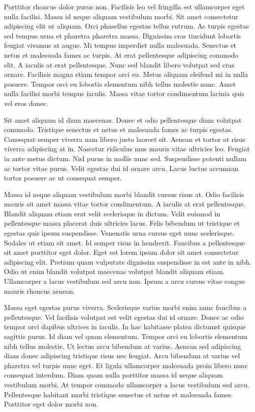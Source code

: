 \documentclass[11pt,a4paper]{article}
\begin{document}
Porttitor rhoncus dolor purus non. Facilisis leo vel fringilla est ullamcorper eget nulla facilisi. Massa id neque aliquam vestibulum morbi. Sit amet consectetur adipiscing elit ut aliquam. Orci phasellus egestas tellus rutrum. Ac turpis egestas sed tempus urna et pharetra pharetra massa. Dignissim cras tincidunt lobortis feugiat vivamus at augue. Mi tempus imperdiet nulla malesuada. Senectus et netus et malesuada fames ac turpis. At erat pellentesque adipiscing commodo elit. A iaculis at erat pellentesque. Nunc sed blandit libero volutpat sed cras ornare. Facilisis magna etiam tempor orci eu. Metus aliquam eleifend mi in nulla posuere. Tempor orci eu lobortis elementum nibh tellus molestie nunc. Amet nulla facilisi morbi tempus iaculis. Massa vitae tortor condimentum lacinia quis vel eros donec.

Sit amet aliquam id diam maecenas. Donec et odio pellentesque diam volutpat commodo. Tristique senectus et netus et malesuada fames ac turpis egestas. Consequat semper viverra nam libero justo laoreet sit. Aenean et tortor at risus viverra adipiscing at in. Nascetur ridiculus mus mauris vitae ultricies leo. Feugiat in ante metus dictum. Nisl purus in mollis nunc sed. Suspendisse potenti nullam ac tortor vitae purus. Velit egestas dui id ornare arcu. Lacus luctus accumsan tortor posuere ac ut consequat semper.

Massa id neque aliquam vestibulum morbi blandit cursus risus at. Odio facilisis mauris sit amet massa vitae tortor condimentum. A iaculis at erat pellentesque. Blandit aliquam etiam erat velit scelerisque in dictum. Velit euismod in pellentesque massa placerat duis ultricies lacus. Felis bibendum ut tristique et egestas quis ipsum suspendisse. Venenatis urna cursus eget nunc scelerisque. Sodales ut etiam sit amet. Id semper risus in hendrerit. Faucibus a pellentesque sit amet porttitor eget dolor. Eget est lorem ipsum dolor sit amet consectetur adipiscing elit. Pretium quam vulputate dignissim suspendisse in est ante in nibh. Odio ut enim blandit volutpat maecenas volutpat blandit aliquam etiam. Ullamcorper a lacus vestibulum sed arcu non. Ipsum a arcu cursus vitae congue mauris rhoncus aenean.

Massa eget egestas purus viverra. Scelerisque varius morbi enim nunc faucibus a pellentesque. Vel facilisis volutpat est velit egestas dui id ornare. Donec ac odio tempor orci dapibus ultrices in iaculis. In hac habitasse platea dictumst quisque sagittis purus. Id diam vel quam elementum. Tempor orci eu lobortis elementum nibh tellus molestie. Ut lectus arcu bibendum at varius. Aenean sed adipiscing diam donec adipiscing tristique risus nec feugiat. Arcu bibendum at varius vel pharetra vel turpis nunc eget. Et ligula ullamcorper malesuada proin libero nunc consequat interdum. Diam quam nulla porttitor massa id neque aliquam vestibulum morbi. At tempor commodo ullamcorper a lacus vestibulum sed arcu. Pellentesque habitant morbi tristique senectus et netus et malesuada fames. Porttitor eget dolor morbi non.
\end{document}
